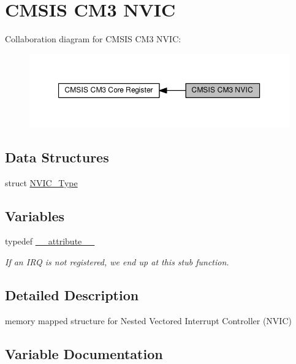 \hypertarget{group__CMSIS__CM3__NVIC}{}\section{C\+M\+S\+IS C\+M3 N\+V\+IC}
\label{group__CMSIS__CM3__NVIC}
Collaboration diagram for C\+M\+S\+IS C\+M3 N\+V\+IC\+:\nopagebreak
\begin{figure}[H]
\begin{center}
\leavevmode
\includegraphics[width=350pt]{de/db9/group__CMSIS__CM3__NVIC}
\end{center}
\end{figure}
\subsection*{Data Structures}
\begin{DoxyCompactItemize}
\item 
struct \hyperlink{structNVIC__Type}{N\+V\+I\+C\+\_\+\+Type}
\end{DoxyCompactItemize}
\subsection*{Variables}
\begin{DoxyCompactItemize}
\item 
typedef \hyperlink{group__CMSIS__CM3__NVIC_ga8c1dfc1ccf00a08192611433ee7f17b4}{\+\_\+\+\_\+attribute\+\_\+\+\_\+}
\begin{DoxyCompactList}\small\item\em If an I\+RQ is not registered, we end up at this stub function. \end{DoxyCompactList}\end{DoxyCompactItemize}


\subsection{Detailed Description}
memory mapped structure for Nested Vectored Interrupt Controller (N\+V\+IC) 

\subsection{Variable Documentation}
